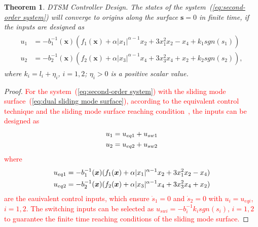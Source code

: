\documentclass[3p]{elsarticle}
\theoremstyle{plain}
\newtheorem{mythm}{Theorem}
\theoremstyle{remark}
\begin{document}
\begin{mythm}\label{theorem:1}DTSM Controller Design. The states of the system~(\ref{eq:second-order system}) will converge to origins along the surface $\bm s=0$ in finite time, if the inputs are designed as
\begin{align}
\begin{split}
u_1 &= -b_1^{-1}(\bm x)(f_1(\bm x)+\alpha\vert x_1\vert^{\alpha-1}x_2+3x_1^2x_2-x_4+k_1sgn(s_1))\\
u_2 &= -b_2^{-1}(\bm x)(f_2(\bm x)+\alpha\vert x_3\vert^{\alpha-1}x_4+3x_3^2x_4+x_2+k_2sgn(s_2)),\label{eq:DSM input}
\end{split}
\end{align}
where $k_i = l_i+\eta_i$, $i=1,2$; $\eta_i>0$ is a positive scalar value.
\end{mythm}
\begin{proof}
\textcolor{red}{For the system~(\ref{eq:second-order system}) with the sliding mode  surface~(\ref{eq:dual sliding mode  surface}), according to the equivalent control technique and the sliding mode  surface reaching condition~\cite{Arie1993sliding}, the inputs can be designed as
\begin{align}\begin{split}
u_1 &= u_{eq1}+u_{sw1}\\
u_2 &= u_{eq2}+u_{sw2}\notag
\end{split}\end{align}
where
\begin{align}\begin{split}
u_{eq1} &= -b_1^{-1}(\bm x)(f_1(\bm x)+\alpha\vert x_1\vert^{\alpha-1}x_2+3x_1^2x_2-x_4)\\
u_{eq2} &= -b_2^{-1}(\bm x)(f_2(\bm x)+\alpha\vert x_3\vert^{\alpha-1}x_4+3x_3^2x_4+x_2)\notag
\end{split}\end{align}
are the eauivalent control inputs, which ensure $\dot s_1 = 0$ and $\dot s_2=0$ with $u_i = u_{eqi}$, $i=1,2$. The switching inputs can be selected as $u_{swi}=-b_i^{-1}k_isgn(s_i)$, $i=1,2$ to guarantee the finite time reaching conditions of the sliding mode  surface.}


\end{proof}
\end{document}
